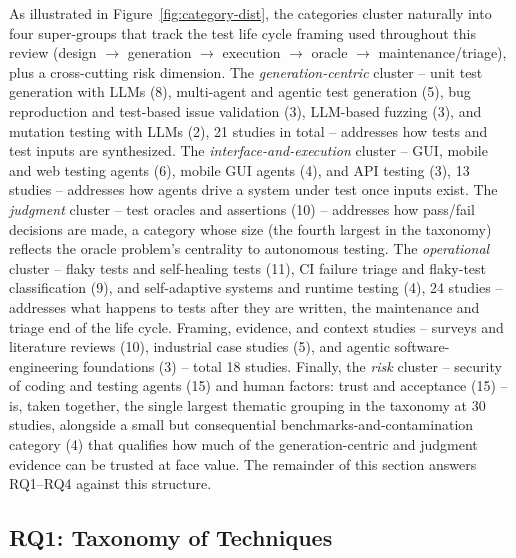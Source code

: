 As illustrated in Figure~\ref{fig:category-dist}, the categories
cluster naturally into four super-groups that track the test
life cycle framing used throughout this review (design $\rightarrow$
generation $\rightarrow$ execution $\rightarrow$ oracle $\rightarrow$
maintenance/triage), plus a cross-cutting risk dimension. The
\emph{generation-centric} cluster -- unit test generation with LLMs
(8), multi-agent and agentic test generation (5), bug reproduction and
test-based issue validation (3), LLM-based fuzzing (3), and mutation
testing with LLMs (2), 21 studies in total -- addresses how tests and
test inputs are synthesized. The \emph{interface-and-execution}
cluster -- GUI, mobile and web testing agents (6), mobile GUI agents
(4), and API testing (3), 13 studies -- addresses how agents drive a
system under test once inputs exist. The \emph{judgment} cluster --
test oracles and assertions (10) -- addresses how pass/fail decisions
are made, a category whose size (the fourth largest in the taxonomy)
reflects the oracle problem's centrality to autonomous testing. The
\emph{operational} cluster -- flaky tests and self-healing tests (11),
CI failure triage and flaky-test classification (9), and self-adaptive
systems and runtime testing (4), 24 studies -- addresses what happens
to tests after they are written, the maintenance and triage end of the
life cycle. Framing, evidence, and context studies -- surveys and
literature reviews (10), industrial case studies (5), and agentic
software-engineering foundations (3) -- total 18 studies. Finally, the
\emph{risk} cluster -- security of coding and testing agents (15) and
human factors: trust and acceptance (15) -- is, taken together, the
single largest thematic grouping in the taxonomy at 30 studies,
alongside a small but consequential benchmarks-and-contamination
category (4) that qualifies how much of the generation-centric and
judgment evidence can be trusted at face value. The remainder of this
section answers RQ1--RQ4 against this structure.

\subsection{RQ1: Taxonomy of Techniques}
\label{subsec:rq1-taxonomy}

